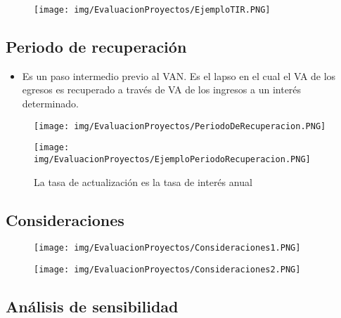 \documentclass[titlepage,a4paper]{article}
\begin{document}
\begin{figure}[!htb]
    \centering
    \texttt{[image: img/EvaluacionProyectos/EjemploTIR.PNG]}
\end{figure}

\newpage
\subsection{Periodo de recuperación}

\begin{itemize}
\item Es un paso intermedio previo al VAN. Es el lapso en el cual el VA de los egresos es recuperado a través de VA de los ingresos a un interés determinado.
\end{itemize}

\begin{figure}[!htb]
    \centering
    \texttt{[image: img/EvaluacionProyectos/PeriodoDeRecuperacion.PNG]}
\end{figure}

\begin{figure}[!htb]
    \centering
    \texttt{[image: img/EvaluacionProyectos/EjemploPeriodoRecuperacion.PNG]}
    \caption{La tasa de actualización es la tasa de interés anual}
\end{figure}

\newpage
\subsection{Consideraciones}

\begin{figure}[!htb]
    \centering
    \texttt{[image: img/EvaluacionProyectos/Consideraciones1.PNG]}
\end{figure}

\begin{figure}[!htb]
    \centering
    \texttt{[image: img/EvaluacionProyectos/Consideraciones2.PNG]}
\end{figure}


\newpage
\subsection{Análisis de sensibilidad}
\end{document}
